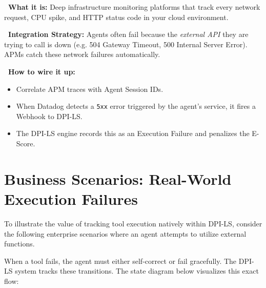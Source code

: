 \documentclass[11pt,a4paper]{article}
\begin{document}
\begin{tcolorbox}[enhanced, colback=gray!5!white, colframe=gray, title={\textbf{\faStopwatch\ Datadog / Dynatrace}}, fonttitle=\bfseries, boxrule=1pt, arc=2mm]
\textbf{\color{dpiblue}\faQuestionCircle\ What it is:} Deep infrastructure monitoring platforms that track every network request, CPU spike, and HTTP status code in your cloud environment.

\vspace{0.2cm}
\textbf{\color{dpigreen}\faCogs\ Integration Strategy:} Agents often fail because the \textit{external API} they are trying to call is down (e.g. 504 Gateway Timeout, 500 Internal Server Error). APMs catch these network failures automatically.

\vspace{0.2cm}
\textbf{\color{dpicloud}\faPlug\ How to wire it up:}
\begin{itemize}
    \item \textbf{\color{gray}\faLink} Correlate APM traces with Agent Session IDs.
    \item \textbf{\color{gray}\faBell} When Datadog detects a \texttt{5xx} error triggered by the agent's service, it fires a Webhook to DPI-LS.
    \item \textbf{\color{gray}\faSortAmountDown} The DPI-LS engine records this as an Execution Failure and penalizes the E-Score.
\end{itemize}
\end{tcolorbox}


\newpage

\section{Business Scenarios: Real-World Execution Failures}

To illustrate the value of tracking tool execution natively within DPI-LS, consider the following enterprise scenarios where an agent attempts to utilize external functions.

When a tool fails, the agent must either self-correct or fail gracefully. The DPI-LS system tracks these transitions. The state diagram below visualizes this exact flow:
\end{document}
